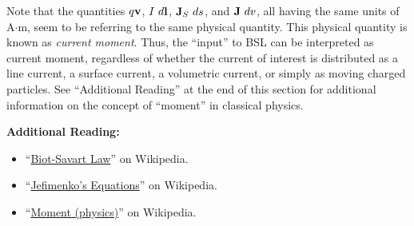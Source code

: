Note that the quantities $q{\bf v}$, $I~d{\bf l}$, ${\bf J}_S~ds$, and ${\bf J}~dv$, all having the same units of A$\cdot$m, seem to be referring to the same physical quantity.
This physical quantity is known as \emph{current moment}.
Thus, the ``input'' to BSL can be interpreted as current moment, regardless of whether the current of interest is distributed as a line current, a surface current, a volumetric current, or simply as moving charged particles.
See ``Additional Reading'' at the end of this section for additional information on the concept of ``moment'' in classical physics.


{\bf Additional Reading:}
\begin{itemize}
\item ``\href{https://wikipedia.org/wiki/Biot-Savart_law}{Biot-Savart Law}'' on Wikipedia.
\item ``\href{https://wikipedia.org/wiki/Jefimenko's_equations}{Jefimenko's Equations}'' on Wikipedia.
\item ``\href{https://en.wikipedia.org/wiki/Moment_(physics)}{Moment (physics)}'' on Wikipedia.

\end{itemize}

